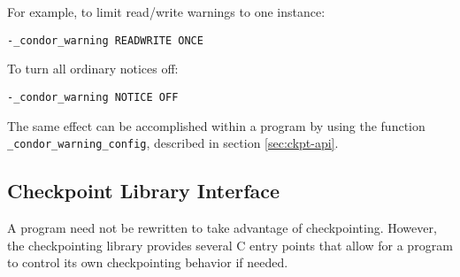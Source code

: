For example, to limit read/write warnings to one instance:

\begin{verbatim}
-_condor_warning READWRITE ONCE
\end{verbatim}

To turn all ordinary notices off:

\begin{verbatim}
-_condor_warning NOTICE OFF
\end{verbatim}

The same effect can be accomplished within a program by using the function
\verb$_condor_warning_config$, described in section \ref{sec:ckpt-api}.

\subsection{\label{sec:ckpt-api}Checkpoint Library Interface}

A program need not be rewritten to take advantage of checkpointing.
However, the checkpointing library provides several C entry points
that allow for a program to control its own checkpointing behavior
if needed.

